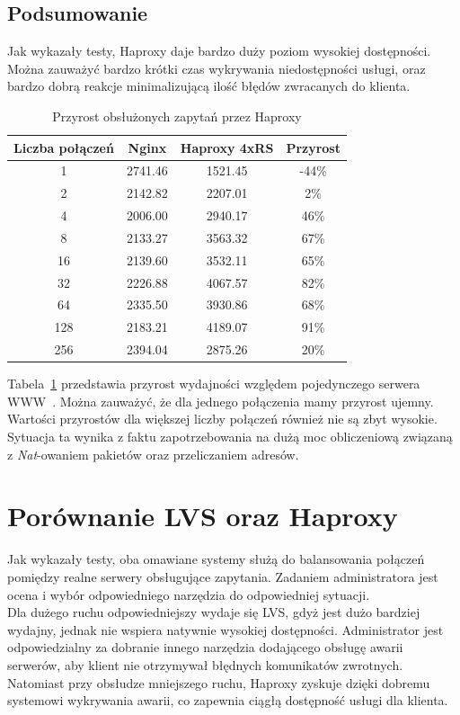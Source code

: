 \subsection{Podsumowanie}
Jak wykazały testy, Haproxy daje bardzo duży poziom wysokiej dostępności.
Można zauważyć bardzo krótki czas wykrywania niedostępności usługi, oraz bardzo dobrą reakcje minimalizującą ilość błędów zwracanych do klienta.\\
\begin{table}[h]
  \centering
  \begin{tabular}{cccc}
      \toprule
      Liczba połączeń & Nginx & Haproxy 4xRS & Przyrost\\
      \midrule
      \midrule
	  1&2741.46&1521.45&-44\%\\
      \midrule
	  2&2142.82&2207.01&2\%\\
      \midrule
	  4&2006.00&2940.17&46\%\\
      \midrule
	  8&2133.27&3563.32&67\%\\
      \midrule
	  16&2139.60&3532.11&65\%\\
      \midrule
	  32&2226.88&4067.57&82\%\\
      \midrule
	  64&2335.50&3930.86&68\%\\
      \midrule
	  128&2183.21&4189.07&91\%\\
      \midrule
	  256&2394.04&2875.26&20\%\\
      \bottomrule
  \end{tabular}
  \caption{Przyrost obsłużonych zapytań przez Haproxy}
  \label{tab:test_haproxy}
  \end{table}
Tabela~\ref{tab:test_haproxy} przedstawia przyrost wydajności względem pojedynczego serwera WWW~.
Można zauważyć, że dla jednego połączenia mamy przyrost ujemny.
Wartości przyrostów dla większej liczby połączeń również nie są zbyt wysokie.
Sytuacja ta wynika z faktu zapotrzebowania na dużą moc obliczeniową związaną z \textit{Nat}-owaniem pakietów oraz przeliczaniem adresów.
\section{Porównanie LVS oraz Haproxy}
Jak wykazały testy, oba omawiane systemy służą do balansowania połączeń pomiędzy realne serwery obsługujące zapytania.
Zadaniem administratora jest ocena i wybór odpowiedniego narzędzia do odpowiedniej sytuacji.\\
Dla dużego ruchu odpowiedniejszy wydaje się LVS, gdyż jest dużo bardziej wydajny, jednak nie wspiera natywnie wysokiej dostępności.
Administrator jest odpowiedzialny za dobranie innego narzędzia dodającego obsługę awarii serwerów, aby klient nie otrzymywał błędnych komunikatów zwrotnych.\\
Natomiast przy obsłudze mniejszego ruchu, Haproxy zyskuje dzięki dobremu systemowi wykrywania awarii, co zapewnia ciągłą dostępność usługi dla klienta.

